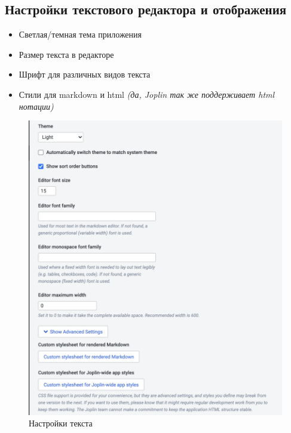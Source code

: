 \documentclass[12pt, a4paper]{article}
\begin{document}
    \subsection{Настройки текстового редактора и отображения}
    \begin{itemize}
        \item Светлая/темная тема приложения
        \item Размер текста в редакторе
        \item Шрифт для различных видов текста
        \item Стили для markdown и html \textit{(да, Joplin так же поддерживает html нотации)}
    \end{itemize}
    \begin{figure}[H]
        \centering
        \includegraphics[width=0.75\linewidth]{src/15.png}
        \caption{Настройки текста}
    \end{figure}
    
    \newpage
\end{document}
